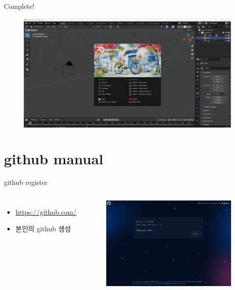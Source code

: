 \documentclass[12pt]{beamer}
\begin{document}
\begin{frame}{Complete!}
    \begin{figure}[t]
        \centering
        \includegraphics[width=1.0\textwidth]{image/install3.jpg}
    \end{figure}
\end{frame}

\section{github manual}

\begin{frame}{github register}
    \begin{columns}
            \begin{itemize}
                \item \small{\url{https://github.com/}} \newline
                \item 본인의 github 생성
            \end{itemize}

            \begin{figure}[t]
            \centering
            \includegraphics[width=1.0\textwidth]{image/github_register.png}
            \end{figure}
    \end{columns}
\end{frame}
\end{document}
